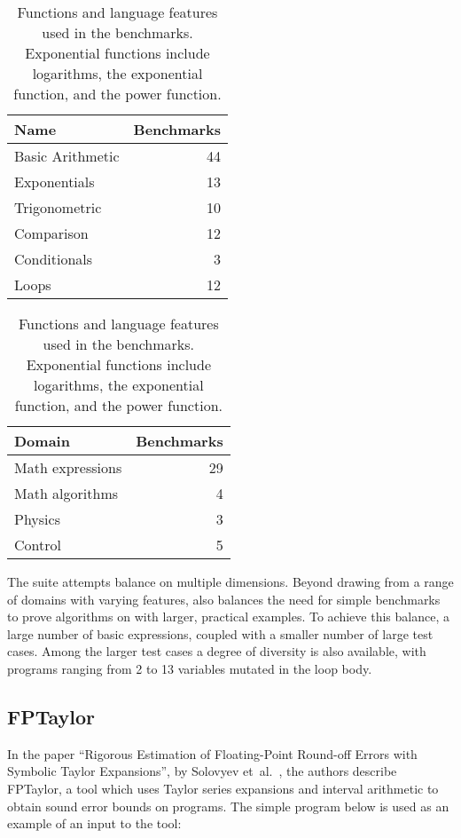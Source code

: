 \documentclass[main.tex]{subfiles}
\begin{document}
\begin{table}[hbtp]
  \begin{minipage}[t]{.45\textwidth}
    \begin{tabular}{lr}
      Name & Benchmarks \\\hline
      Basic Arithmetic & 44 \\
      Exponentials & 13 \\
      Trigonometric & 10 \\
      Comparison & 12 \\
      Conditionals & 3 \\
      Loops & 12
    \end{tabular}
    \caption{Domains from which the \name benchmarks are taken. The
      mathematical expressions are the smallest, and are largely
      drawn from \textit{Numerical Methods for Scientists and
        Engineers}~\cite{hamming-1987}.}
    \label{tbl:domains}
  \end{minipage}
  \hfill
  \begin{minipage}[t]{.45\textwidth}
    \begin{tabular}{lr}
      Domain & Benchmarks \\\hline
      Math expressions & 29 \\
      Math algorithms & 4 \\
      Physics & 3 \\
      Control & 5
    \end{tabular}
    \caption{Functions and language features used in the \name
      benchmarks. Exponential functions include logarithms, the
      exponential function, and the power function.}
    \label{tbl:features}
  \end{minipage}
\end{table}

The \name suite attempts balance on multiple dimensions.
Beyond drawing from a range of domains with varying features,
  \name also balances the need for simple benchmarks
  to prove algorithms on
  with larger, practical examples.
To achieve this balance,
  a large number of basic expressions,
  coupled with a smaller number of large test cases.
Among the larger test cases a degree of diversity is also available,
  with programs ranging
  from 2 to 13 variables mutated in the loop body.

\subsection{FPTaylor}
In the paper ``Rigorous Estimation of Floating-Point Round-off Errors
with Symbolic Taylor Expansions'',
by Solovyev et~al.~\cite{fptaylor-fm15},
the authors describe FPTaylor, a tool which uses Taylor
series expansions and interval arithmetic to obtain sound error bounds
on programs. The simple program below is used as an example of an input
to the tool:
\end{document}
